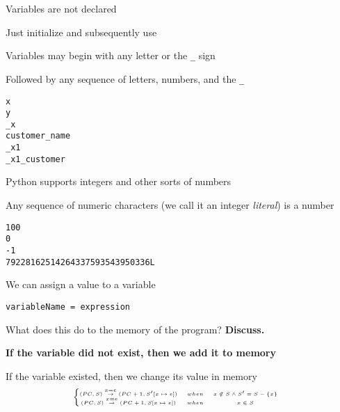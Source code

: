 \documentclass{beamer}
\begin{document}
\begin{slide}{
\item Variables are not declared
\item Just initialize and subsequently use
}\end{slide}

\begin{slide}{
\item Variables may begin with any letter or the \texttt{\_} sign
\item Followed by any sequence of letters, numbers, and the \texttt{\_}
}\end{slide}

\begin{frame}[fragile]
\begin{lstlisting}
x
y
_x
customer_name
_x1
_x1_customer
\end{lstlisting}
\end{frame}

\begin{slide}{
\item Python supports integers and other sorts of numbers
\item Any sequence of numeric characters (we call it an integer \textit{literal}) is a number
}\end{slide}

\begin{frame}[fragile]
\begin{lstlisting}
100
0
-1
79228162514264337593543950336L
\end{lstlisting}
\end{frame}

\begin{slide}{
\item We can assign a value to a variable
\item \texttt{variableName = expression}
\item What does this do to the memory of the program? \textbf{Discuss.}
\pause
\item \textbf{If the variable did not exist, then we add it to memory}
\item If the variable existed, then we change its value in memory 
$$
\tiny
\left\{
\begin{matrix}
(PC,S) \overset{x = e}{\rightarrow} (PC+1,S'[x \mapsto e]) &when& x \notin S \wedge S' = S - \{x\} & \\
(PC,S) \overset{x = e}{\rightarrow} (PC+1,S[x \mapsto e]) &when& x \in S& \\
\end{matrix}
\right.
$$
}\end{slide}
\end{document}
